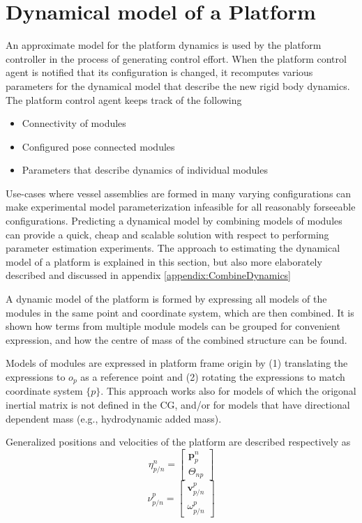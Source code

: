 \section{Dynamical model of a Platform}
\label{platformModel}
An approximate model for the platform dynamics is used by the platform controller in the process of generating control effort. When the platform control agent is notified that its configuration is changed, it recomputes various parameters for the dynamical model that describe the new rigid body dynamics.
The platform control agent keeps track of the following 
\begin{itemize}
	\item Connectivity of modules
	\item Configured pose connected modules
	\item Parameters that describe dynamics of individual modules
\end{itemize}

Use-cases where vessel assemblies are formed in many varying configurations can make experimental model parameterization infeasible for all reasonably forseeable configurations.  Predicting a dynamical model by combining models of modules can provide a quick, cheap and scalable solution with respect to performing parameter estimation experiments. 
The approach to estimating the dynamical model of a platform is explained in this section, but also more elaborately described and discussed in appendix \ref{appendix:CombineDynamics}

A dynamic model of the platform is formed by expressing all models of the modules in the same point and coordinate system, which are then combined. It is shown how terms from multiple module models can be grouped for convenient expression, and how the centre of mass of the combined structure can be found. 

Models of modules are expressed in platform frame origin by (1) translating the expressions to $o_{p}$ as a reference point and (2) rotating the expressions to match  coordinate system $\{p\}$. This approach works also for models of which the origonal inertial matrix is not defined in the CG, and/or for models that have directional dependent mass (e.g., hydrodynamic added mass). 

Generalized positions and velocities of the platform are described respectively as
\begin{equation}
	\eta_{p/n}^{n} = \begin{bmatrix} \textbf{p}^{n}_{p} \\[8pt]  \Theta_{np} \end{bmatrix}
\end{equation}
\begin{equation}
	\nu_{p/n}^{p} = \begin{bmatrix} \textbf{v}^{p}_{p/n} \\[8pt]  \omega^{p}_{p/n} \end{bmatrix}
\end{equation}

